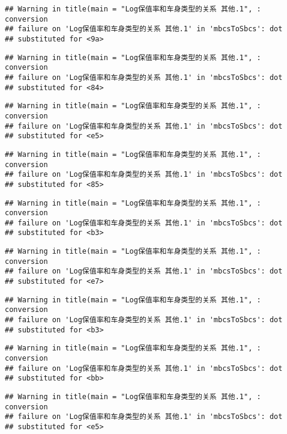 \documentclass[]{article}
\begin{document}
\begin{verbatim}
## Warning in title(main = "Log保值率和车身类型的关系 其他.1", : conversion
## failure on 'Log保值率和车身类型的关系 其他.1' in 'mbcsToSbcs': dot
## substituted for <9a>
\end{verbatim}

\begin{verbatim}
## Warning in title(main = "Log保值率和车身类型的关系 其他.1", : conversion
## failure on 'Log保值率和车身类型的关系 其他.1' in 'mbcsToSbcs': dot
## substituted for <84>
\end{verbatim}

\begin{verbatim}
## Warning in title(main = "Log保值率和车身类型的关系 其他.1", : conversion
## failure on 'Log保值率和车身类型的关系 其他.1' in 'mbcsToSbcs': dot
## substituted for <e5>
\end{verbatim}

\begin{verbatim}
## Warning in title(main = "Log保值率和车身类型的关系 其他.1", : conversion
## failure on 'Log保值率和车身类型的关系 其他.1' in 'mbcsToSbcs': dot
## substituted for <85>
\end{verbatim}

\begin{verbatim}
## Warning in title(main = "Log保值率和车身类型的关系 其他.1", : conversion
## failure on 'Log保值率和车身类型的关系 其他.1' in 'mbcsToSbcs': dot
## substituted for <b3>
\end{verbatim}

\begin{verbatim}
## Warning in title(main = "Log保值率和车身类型的关系 其他.1", : conversion
## failure on 'Log保值率和车身类型的关系 其他.1' in 'mbcsToSbcs': dot
## substituted for <e7>
\end{verbatim}

\begin{verbatim}
## Warning in title(main = "Log保值率和车身类型的关系 其他.1", : conversion
## failure on 'Log保值率和车身类型的关系 其他.1' in 'mbcsToSbcs': dot
## substituted for <b3>
\end{verbatim}

\begin{verbatim}
## Warning in title(main = "Log保值率和车身类型的关系 其他.1", : conversion
## failure on 'Log保值率和车身类型的关系 其他.1' in 'mbcsToSbcs': dot
## substituted for <bb>
\end{verbatim}

\begin{verbatim}
## Warning in title(main = "Log保值率和车身类型的关系 其他.1", : conversion
## failure on 'Log保值率和车身类型的关系 其他.1' in 'mbcsToSbcs': dot
## substituted for <e5>
\end{verbatim}
\end{document}
